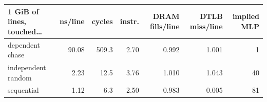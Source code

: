\begin{tabular}{lrrrrrr}
\toprule
1 GiB of lines, touched\ldots & ns/line & cycles & instr. & DRAM fills/line & DTLB miss/line & implied MLP \\
\midrule
dependent chase & 90.08 & 509.3 & 2.70 & 0.992 & 1.001 & 1 \\
independent random & 2.23 & 12.5 & 3.76 & 1.010 & 1.043 & 40 \\
sequential & 1.12 & 6.3 & 2.50 & 0.983 & 0.005 & 81 \\
\bottomrule
\end{tabular}
